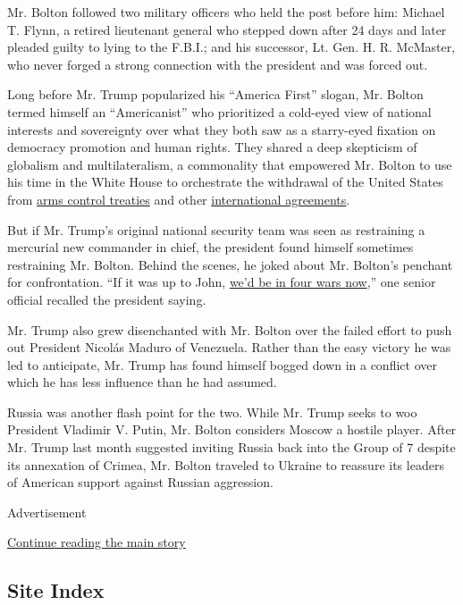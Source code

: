 Mr. Bolton followed two military officers who held the post before him:
Michael T. Flynn, a retired lieutenant general who stepped down after 24
days and later pleaded guilty to lying to the F.B.I.; and his successor,
Lt. Gen. H. R. McMaster, who never forged a strong connection with the
president and was forced out.

Long before Mr. Trump popularized his ``America First'' slogan, Mr.
Bolton termed himself an ``Americanist'' who prioritized a cold-eyed
view of national interests and sovereignty over what they both saw as a
starry-eyed fixation on democracy promotion and human rights. They
shared a deep skepticism of globalism and multilateralism, a commonality
that empowered Mr. Bolton to use his time in the White House to
orchestrate the withdrawal of the United States from
\href{https://www.nytimes.com/2019/02/01/us/politics/trump-inf-nuclear-treaty.html}{arms
control treaties} and other
\href{https://www.nytimes.com/2018/10/03/world/middleeast/us-withdraws-treaty-iran.html}{international
agreements}.

But if Mr. Trump's original national security team was seen as
restraining a mercurial new commander in chief, the president found
himself sometimes restraining Mr. Bolton. Behind the scenes, he joked
about Mr. Bolton's penchant for confrontation. ``If it was up to John,
\href{https://www.nytimes.com/2019/05/16/world/middleeast/iran-war-donald-trump.html?module=inline}{we'd
be in four wars now},'' one senior official recalled the president
saying.

Mr. Trump also grew disenchanted with Mr. Bolton over the failed effort
to push out President Nicolás Maduro of Venezuela. Rather than the easy
victory he was led to anticipate, Mr. Trump has found himself bogged
down in a conflict over which he has less influence than he had assumed.

Russia was another flash point for the two. While Mr. Trump seeks to woo
President Vladimir V. Putin, Mr. Bolton considers Moscow a hostile
player. After Mr. Trump last month suggested inviting Russia back into
the Group of 7 despite its annexation of Crimea, Mr. Bolton traveled to
Ukraine to reassure its leaders of American support against Russian
aggression.

Advertisement

\protect\hyperlink{after-bottom}{Continue reading the main story}

\hypertarget{site-index}{%
\subsection{Site Index}\label{site-index}}

